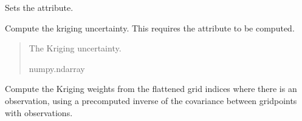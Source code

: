 \documentclass[letterpaper,10pt,english]{sphinxmanual}
\begin{document}
\begin{fulllineitems}
\begin{fulllineitems}
\sphinxAtStartPar
Sets the  attribute.
\begin{quote}\begin{description}
\sphinxAtStartPar
{}

\end{description}\end{quote}

\end{fulllineitems}


\begin{fulllineitems}
\label{\detokenize{kriging:glomar_gridding.kriging.SimpleKriging.get_uncertainty}}
\pysigstartsignatures
\pysiglinewithargsret
{}
{}
{}
\pysigstopsignatures
\sphinxAtStartPar
Compute the kriging uncertainty. This requires the attribute
 to be computed.
\begin{quote}\begin{description}
\sphinxAtStartPar
{} \textendash{} The Kriging uncertainty.

\sphinxAtStartPar
numpy.ndarray

\end{description}\end{quote}

\end{fulllineitems}


\begin{fulllineitems}
\label{\detokenize{kriging:glomar_gridding.kriging.SimpleKriging.kriging_weights_from_inverse}}
\pysigstartsignatures
\pysiglinewithargsret
{}
{}
{}
\pysigstopsignatures
\sphinxAtStartPar
Compute the Kriging weights from the flattened grid indices where
there is an observation, using a pre\sphinxhyphen{}computed inverse of the covariance
between grid\sphinxhyphen{}points with observations.


\end{fulllineitems}
\end{fulllineitems}
\end{document}

